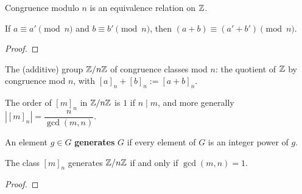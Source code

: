 \begin{proposition}
  \label{prop:groups:equivalence-cong-mod}
  Congruence modulo $n$ is an equivalence relation on $\mathbb{Z}$.
\end{proposition}

\begin{lemma}
  \label{lem:groups:congruence-addition}
  \leanok
  If $a \equiv a' \pmod{n}$ and $b \equiv b' \pmod{n}$, then
  $(a+b) \equiv (a'+b') \pmod{n}$.
\end{lemma}
\begin{proof}
  \leanok
\end{proof}

\begin{definition}[$\Z/n\Z$]
  \label{def:groups:zmod-group}
  The (additive) group $\Z/n\Z$ of congruence classes mod $n$: the
  quotient of $\mathbb{Z}$ by congruence mod $n$, with
  $[a]_n + [b]_n := [a+b]_n$.
\end{definition}

\begin{proposition}
  \label{prop:groups:order-class}
  The order of $[m]_n$ in $\Z/n\Z$ is $1$ if $n \mid m$, and more
  generally $|[m]_n| = \dfrac{n}{\gcd(m,n)}$.
\end{proposition}

\begin{definition}[Generator]
  \label{def:groups:generates}
  \leanok
  An element $g \in G$ \textbf{generates} $G$ if every element of $G$
  is an integer power of $g$.
\end{definition}

\begin{corollary}
  \label{coro:groups:generator-coprime}
  The class $[m]_n$ generates $\Z/n\Z$ if and only if $\gcd(m,n) = 1$.
\end{corollary}
\begin{proof}
\end{proof}

